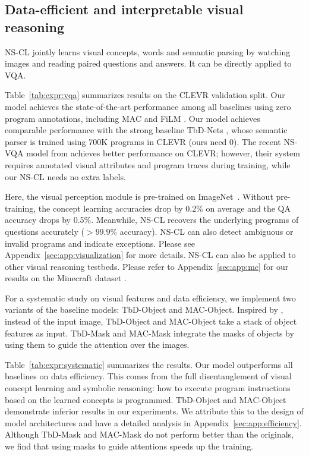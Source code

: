\documentclass{article} %
\newcommand{\tbl}[1]{Table~\ref{#1}}
\newcommand{\model}{NS-CL\xspace}
\begin{document}
\subsection{Data-efficient and interpretable visual reasoning}

\model jointly learns visual concepts, words and semantic parsing by watching images and reading paired questions and answers. It can be directly applied to VQA.

\tbl{tab:expr:vqa} summarizes results on the CLEVR validation split. %
Our model achieves the state-of-the-art performance among all baselines using zero program annotations, including MAC \citep{Hudson2018Compositional} and FiLM \citep{Perez2017Film}. Our model achieves comparable performance with the strong baseline TbD-Nets \citep{Mascharka2018Transparency}, whose semantic parser is trained using 700K programs in CLEVR (ours need 0). The recent NS-VQA model from \cite{kexin} achieves better performance on CLEVR; however, their system requires annotated visual attributes and program traces during training, while our \model needs no extra labels.

Here, the visual perception module is pre-trained on ImageNet~\citep{Deng2009Imagenet}. Without pre-training, the concept learning accuracies drop by 0.2\% on average and the QA accuracy drops by 0.5\%. Meanwhile, \model recovers the underlying programs of questions accurately ($>99.9\%$ accuracy). \model can also detect ambiguous or invalid programs and indicate exceptions. Please see Appendix~\ref{sec:app:visualization} for more details. \model can also be applied to other visual reasoning testbeds. Please refer to Appendix~\ref{sec:app:mc} for our results on the Minecraft dataset \citep{kexin}.

For a systematic study on visual features and data efficiency, we implement two variants of the baseline models: TbD-Object and MAC-Object. Inspired by \citep{Anderson2017BottomUp}, instead of the input image, TbD-Object and MAC-Object take a stack of object features as input. TbD-Mask and MAC-Mask integrate the masks of objects by using them to guide the attention over the images.

Table~\ref{tab:expr:systematic} summarizes the results. Our model outperforms all baselines on data efficiency. This comes from the full disentanglement of visual concept learning and symbolic reasoning: how to execute program instructions based on the learned concepts is programmed. TbD-Object and MAC-Object demonstrate inferior results in our experiments. We attribute this to the design of model architectures and have a detailed analysis in Appendix~\ref{sec:app:efficiency}. Although TbD-Mask and MAC-Mask do not perform better than the originals, we find that using masks to guide attentions speeds up the training. 
\end{document}

